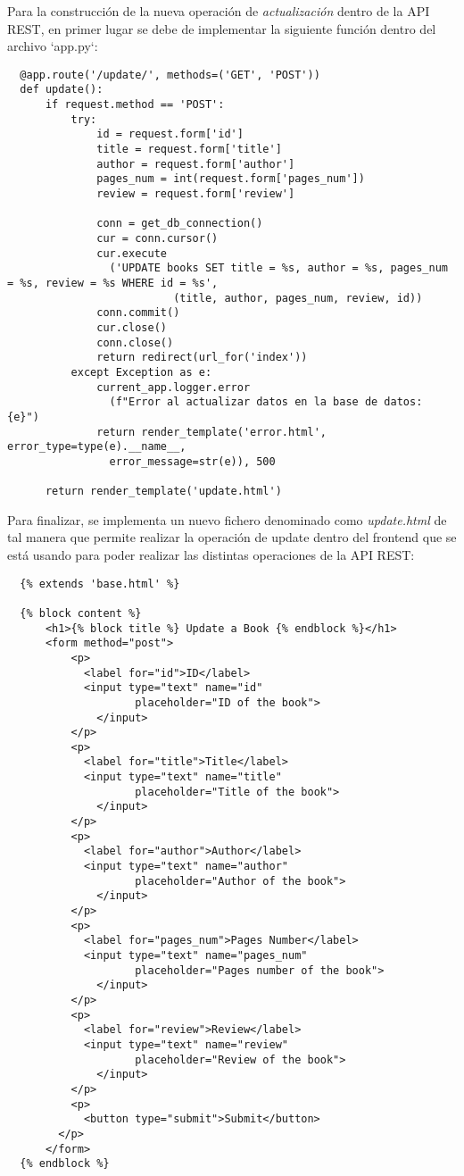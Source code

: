 \documentclass[11pt]{report}
\begin{document}
Para la construcción de la nueva operación de \emph{actualización} dentro de la API REST, en primer lugar se debe de implementar la siguiente función dentro del archivo `app.py`:

\begin{verbatim}
  @app.route('/update/', methods=('GET', 'POST'))
  def update():
      if request.method == 'POST':
          try:
              id = request.form['id']
              title = request.form['title']
              author = request.form['author']
              pages_num = int(request.form['pages_num'])
              review = request.form['review']

              conn = get_db_connection()
              cur = conn.cursor()
              cur.execute
                ('UPDATE books SET title = %s, author = %s, pages_num = %s, review = %s WHERE id = %s',
                          (title, author, pages_num, review, id))
              conn.commit()
              cur.close()
              conn.close()
              return redirect(url_for('index'))
          except Exception as e:
              current_app.logger.error
                (f"Error al actualizar datos en la base de datos: {e}")
              return render_template('error.html', error_type=type(e).__name__, 
                error_message=str(e)), 500
              
      return render_template('update.html')
\end{verbatim}

Para finalizar, se implementa un nuevo fichero denominado como \emph{update.html} de tal manera que permite realizar la operación de update dentro del frontend que se está usando para poder realizar las distintas operaciones de la API REST:

\begin{verbatim}
  {% extends 'base.html' %}

  {% block content %}
      <h1>{% block title %} Update a Book {% endblock %}</h1>
      <form method="post">
          <p>
            <label for="id">ID</label>
            <input type="text" name="id"
                    placeholder="ID of the book">
              </input>
          </p>
          <p>
            <label for="title">Title</label>
            <input type="text" name="title"
                    placeholder="Title of the book">
              </input>
          </p>
          <p>
            <label for="author">Author</label>
            <input type="text" name="author"
                    placeholder="Author of the book">
              </input>
          </p>
          <p>
            <label for="pages_num">Pages Number</label>
            <input type="text" name="pages_num"
                    placeholder="Pages number of the book">
              </input>
          </p>
          <p>
            <label for="review">Review</label>
            <input type="text" name="review"
                    placeholder="Review of the book">
              </input>
          </p>
          <p>
            <button type="submit">Submit</button>
        </p>
      </form>
  {% endblock %}
\end{verbatim}
\end{document}
